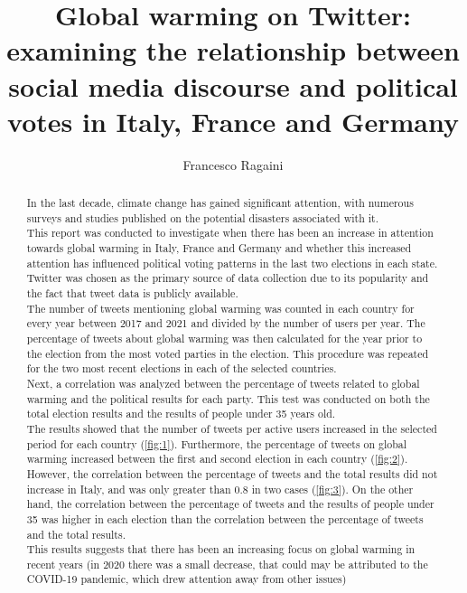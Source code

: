 \documentclass[a4paper,10pt,rmp,superscriptaddress]{revtex4}
\begin{document}
\title{Global warming on Twitter: examining the relationship between social media discourse and political votes in Italy, 
France and Germany}
\author{Francesco Ragaini}
\begin{abstract}
    In the last decade, climate change has gained significant attention, with numerous surveys and studies 
    published on the potential disasters associated with it.\\
    This report was conducted to investigate when there has been an increase in attention towards global warming in Italy, 
    France and Germany and whether this increased attention has influenced political voting patterns in the last two elections in 
    each state.\\
    Twitter was chosen as the primary source of data collection due to its popularity and the fact that tweet data is publicly available.\\ 
    The number of tweets mentioning global warming was counted in each country for every year between 2017 and 2021 and 
    divided by the number of users per year.
    The percentage of tweets about global warming was then calculated for the year prior to the election from the most 
    voted parties in the election.
    This procedure was repeated for the two most recent elections in each of the selected countries.\\
    Next, a correlation was analyzed between the percentage of tweets related to global warming and the political results for each party. 
    This test was conducted on both the total election results and the results of people under 35 years old.\\
    The results showed that the number of tweets per active users increased in the selected period for each country (\ref*{fig:1}). 
    Furthermore, the percentage of tweets on global warming increased between the first and second election in each country (\ref*{fig:2}).
    However, the correlation between the percentage of tweets and the total results did not increase in Italy, 
    and was only greater than 0.8 in two cases (\ref*{fig:3}).
    On the other hand, the correlation between the percentage of tweets and the results of people under 35 was higher in 
    each election than the correlation between the percentage of tweets and the total results.\\
    This results suggests that there has been an increasing focus on global warming in recent years (in 2020 there was a small decrease, 
    that could may be attributed to the COVID-19 pandemic, which drew attention away from other issues) 

\end{abstract}
\end{document}
